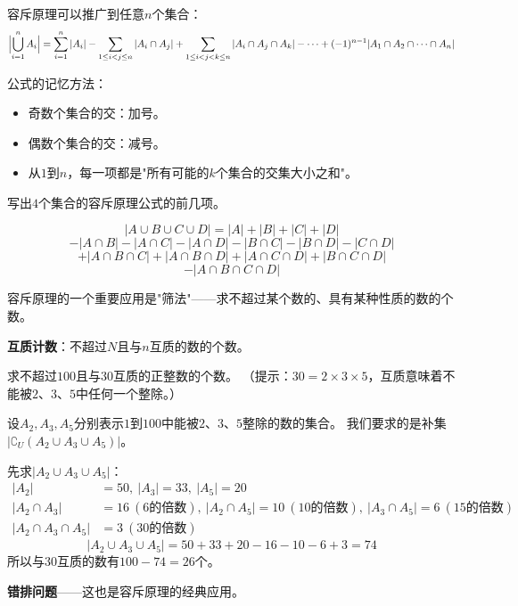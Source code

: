 容斥原理可以推广到任意$n$个集合：
\[
\Bigl|\bigcup_{i=1}^n A_i\Bigr| = \sum_{i=1}^n |A_i| - \sum_{1\le i<j\le n} |A_i\cap A_j| + \sum_{1\le i<j<k\le n} |A_i\cap A_j\cap A_k| - \cdots + (-1)^{n-1}|A_1\cap A_2\cap\cdots\cap A_n|
\]

公式的记忆方法：
\begin{itemize}
\item 奇数个集合的交：加号。
\item 偶数个集合的交：减号。
\item 从$1$到$n$，每一项都是"所有可能的$k$个集合的交集大小之和"。
\end{itemize}

\begin{example}
写出$4$个集合的容斥原理公式的前几项。
\end{example}
\begin{solution}
\[
|A\cup B\cup C\cup D| = |A|+|B|+|C|+|D|
\]
\[
- |A\cap B| - |A\cap C| - |A\cap D| - |B\cap C| - |B\cap D| - |C\cap D|
\]
\[
+ |A\cap B\cap C| + |A\cap B\cap D| + |A\cap C\cap D| + |B\cap C\cap D|
\]
\[
- |A\cap B\cap C\cap D|
\]
\end{solution}


容斥原理的一个重要应用是"筛法"——求不超过某个数的、具有某种性质的数的个数。

\textbf{互质计数}：不超过$N$且与$n$互质的数的个数。

\begin{example}
求不超过$100$且与$30$互质的正整数的个数。
（提示：$30 = 2\times3\times5$，互质意味着不能被$2$、$3$、$5$中任何一个整除。）
\end{example}
\begin{solution}
设$A_2,A_3,A_5$分别表示$1$到$100$中能被$2$、$3$、$5$整除的数的集合。
我们要求的是补集$| \complement_U (A_2\cup A_3\cup A_5) |$。

先求$|A_2\cup A_3\cup A_5|$：
\begin{align*}
|A_2| &= 50,\ |A_3| = 33,\ |A_5| = 20\\
|A_2\cap A_3| &= 16\ (6\text{的倍数}),\ |A_2\cap A_5| = 10\ (10\text{的倍数}),\ |A_3\cap A_5| = 6\ (15\text{的倍数})\\
|A_2\cap A_3\cap A_5| &= 3\ (30\text{的倍数})
\end{align*}
\[
|A_2\cup A_3\cup A_5| = 50+33+20 - 16-10-6 + 3 = 74
\]
所以与$30$互质的数有$100 - 74 = 26$个。
\end{solution}

\textbf{错排问题}——这也是容斥原理的经典应用。

